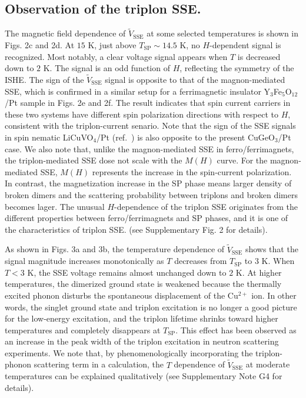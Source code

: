 \documentclass{nature}
\begin{document}
\subsection{Observation of the triplon SSE.} 
The magnetic field dependence of $\tilde{V}_{\mathrm{SSE}}$ at some selected temperatures is shown in Figs. 2c and 2d. 
At $15$ K, just above $ T_{\mathrm{SP}} \sim 14.5 $ K, no $H$-dependent signal is recognized.
Most notably, a clear voltage signal appears when $T$ is decreased down to $2$ K. 
The signal is an odd function of $H$, reflecting the symmetry of the ISHE\cite{maekawa2012spin}. 
The sign of the $\tilde{V}_{\mathrm{SSE}}$ signal is opposite to that of the magnon-mediated SSE\cite{Kikkawa:2015bn,2010ApPhL..97q2505U}, which is confirmed in a similar setup for a ferrimagnetic insulator Y$_3$Fe$_5$O$_{12}$/Pt sample in Figs. 2e and 2f.
The result indicates that spin current carriers in these two systems have different spin polarization directions with respect to $H$, consistent with the triplon-current senario.
 Note that the sign of the SSE signals in spin nematic LiCuVO$_4$/Pt   (ref.~\cite{Hirobe:2019cf}) is also opposite to the present CuGeO$_3$/Pt case.
 We also note that, unlike the magnon-mediated SSE in ferro/ferrimagnets, the triplon-mediated SSE dose not scale with the $M(H)$ curve. For the magnon-mediated SSE\cite{2010ApPhL..97q2505U}, $M(H)$ represents the increase in the spin-current polarization. 
  In contrast, the magnetization increase in the SP phase means larger density of broken dimers and the scattering probability between triplons and broken dimers becomes lager.
  The unusual $H$-dependence of the triplon SSE originates from the different properties between ferro/ferrimagnets and SP phases, and it is one of the characteristics of triplon SSE. 
 (see Supplementary Fig. 2 for details).




\par 




 As shown in Figs. 3a and 3b, the temperature dependence of $\tilde{V}_{\mathrm{SSE}}$ shows that the signal magnitude increases monotonically as $T$ decreases from $T_{\mathrm{SP}}$ to $3$ K. When $T < 3$ K, the SSE voltage remains almost unchanged down to $2$ K.
 At higher temperatures, the dimerized ground state is weakened because the thermally excited phonon disturbs the spontaneous displacement of the Cu$^{2+}$ ion. 
 In other words, the singlet ground state and triplon excitation is no longer a good picture for the low-energy excitation, and the triplon lifetime shrinks toward higher temperatures and completely disappears at $T_{\mathrm{SP}}$.
 This effect has been observed as an increase in the peak width of the triplon excitation in neutron scattering experiments\cite{Lussier:1996gja}. 
We note that, by phenomenologically incorporating the triplon-phonon scattering term in a calculation, the $T$ dependence of $\tilde{V}_{\mathrm{SSE}}$ at moderate temperatures can be explained qualitatively (see Supplementary Note G4 for details).
\end{document}
